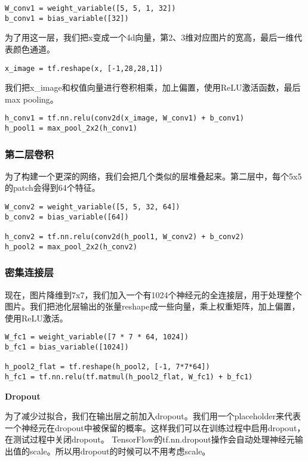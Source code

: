 \begin{lstlisting}
W_conv1 = weight_variable([5, 5, 1, 32])
b_conv1 = bias_variable([32])
\end{lstlisting}

为了用这一层，我们把x变成一个4d向量，第2、3维对应图片的宽高，最后一维代表颜色通道。

\begin{lstlisting}
x_image = tf.reshape(x, [-1,28,28,1])
\end{lstlisting}

我们把x\_image和权值向量进行卷积相乘，加上偏置，使用ReLU激活函数，最后max pooling。

\begin{lstlisting}
h_conv1 = tf.nn.relu(conv2d(x_image, W_conv1) + b_conv1)
h_pool1 = max_pool_2x2(h_conv1)
\end{lstlisting}

\subsubsection{第二层卷积}

为了构建一个更深的网络，我们会把几个类似的层堆叠起来。第二层中，每个5x5的patch会得到64个特征。

\begin{lstlisting}
W_conv2 = weight_variable([5, 5, 32, 64])
b_conv2 = bias_variable([64])

h_conv2 = tf.nn.relu(conv2d(h_pool1, W_conv2) + b_conv2)
h_pool2 = max_pool_2x2(h_conv2)
\end{lstlisting}

\subsubsection{密集连接层}

现在，图片降维到7x7，我们加入一个有1024个神经元的全连接层，用于处理整个图片。我们把池化层输出的张量reshape成一些向量，乘上权重矩阵，加上偏置，使用ReLU激活。

\begin{lstlisting}
W_fc1 = weight_variable([7 * 7 * 64, 1024])
b_fc1 = bias_variable([1024])

h_pool2_flat = tf.reshape(h_pool2, [-1, 7*7*64])
h_fc1 = tf.nn.relu(tf.matmul(h_pool2_flat, W_fc1) + b_fc1)
\end{lstlisting}

\textbf{Dropout}

为了减少过拟合，我们在输出层之前加入dropout。我们用一个placeholder来代表一个神经元在dropout中被保留的概率。这样我们可以在训练过程中启用dropout，在测试过程中关闭dropout。 TensorFlow的tf.nn.dropout操作会自动处理神经元输出值的scale。所以用dropout的时候可以不用考虑scale。

